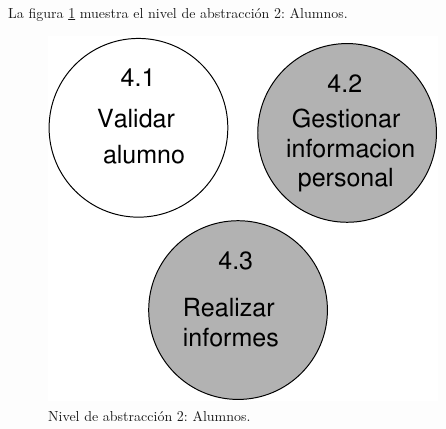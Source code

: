 \paragraph{}La figura \ref{diagramaNivel2-Alumnos} muestra el nivel de
abstracción 2: Alumnos.

  \begin{figure}[!ht]
    \begin{center}
      \includegraphics[]{08.Analisis_Funcional/8.2.DFDs/Niveles/Nivel2/Diagramas/nivel2-Alumnos.pdf}
      \caption{Nivel de abstracción 2: Alumnos.}
      \label{diagramaNivel2-Alumnos}
    \end{center}
  \end{figure}